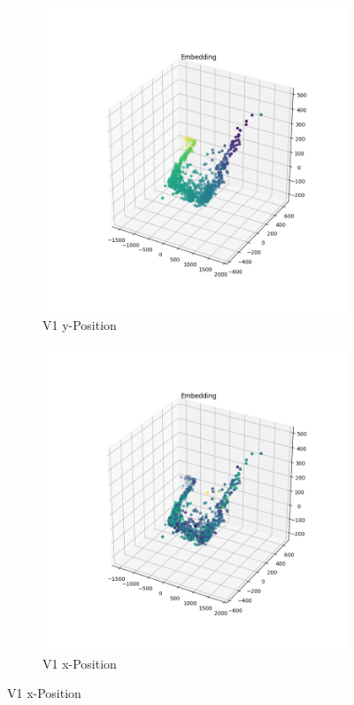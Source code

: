 	 \begin{figure}[h]
		\centering
		
		\begin{subfigure}[c]{0.49\textwidth}			
			\includegraphics[width=1\textwidth,center]{bilder/Hauptteil/MT_Grapple/EMB_alle/1_Embedding_y.png}
			\caption{V1 y-Position}
			\label{img:Einbettung1_y}	
		\end{subfigure}
		\centering
		\begin{subfigure}[c]{0.49\textwidth}			
			\includegraphics[width=1\textwidth,center]{bilder/Hauptteil/MT_Grapple/EMB_alle/1_Embedding_x.png}
			\caption{V1 x-Position}
			\label{img:Einbettung1_x}		
		\end{subfigure}
	

\end{figure}
